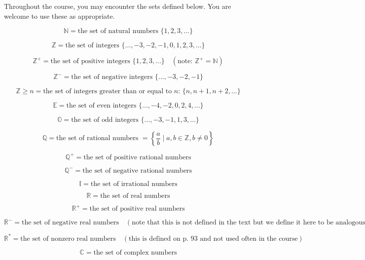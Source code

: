 \documentclass{article}
\begin{document}
Throughout the course, you may encounter the sets defined below. You are welcome to use these as appropriate.

\[
    \mathbb{N} = \text{{the set of natural numbers }} \{1,2,3,\ldots\}
\]

\[
    \mathbb{Z} = \text{{the set of integers }} \{\ldots,-3,-2,-1,0,1,2,3,\ldots\}
\]

\[
    \mathbb{Z}^+ = \text{{the set of positive integers }} \{1,2,3,\ldots\} \quad (\text{{note: }} \mathbb{Z}^+ = \mathbb{N})
\]

\[
    \mathbb{Z}^- = \text{{the set of negative integers }} \{\ldots,-3,-2,-1\}
\]

\[
    \mathbb{Z} \geq n = \text{{the set of integers greater than or equal to }} n \text{{: }} \{n,n+1,n+2,\ldots\}
\]

\[
    \mathbb{E} = \text{{the set of even integers }} \{\ldots,-4,-2,0,2,4,\ldots\}
\]

\[
    \mathbb{O} = \text{{the set of odd integers }} \{\ldots,-3,-1,1,3,\ldots\}
\]

\[
    \mathbb{Q} = \text{{the set of rational numbers }} = \left\{\frac{a}{b} \mid a,b \in \mathbb{Z}, b \neq 0\right\}
\]

\[
    \mathbb{Q}^+ = \text{{the set of positive rational numbers}}
\]

\[
    \mathbb{Q}^- = \text{{the set of negative rational numbers}}
\]

\[
    \mathbb{I} = \text{{the set of irrational numbers}}
\]

\[
    \mathbb{R} = \text{{the set of real numbers}}
\]

\[
    \mathbb{R}^+ = \text{{the set of positive real numbers}}
\]

\[
    \mathbb{R}^- = \text{{the set of negative real numbers}} \quad (\text{{note that this is not defined in the text but we define it here to be analogous to }} \mathbb{Z}^- \text{{ and }} \mathbb{Q}^-)
\]

\[
    \mathbb{R}^* = \text{{the set of nonzero real numbers}} \quad (\text{{this is defined on p. 93 and not used often in the course}})
\]

\[
    \mathbb{C} = \text{{the set of complex numbers}}
\]
\end{document}
